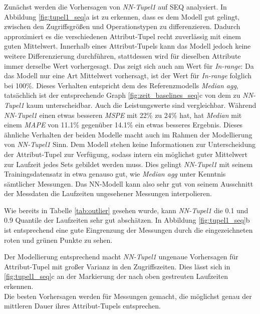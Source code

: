 \documentclass[
	12pt,
	a4paper,
	BCOR10mm,
	DIV14,
	listof=totoc,
	bibliography=totoc,
	headsepline
]{scrreprt}
\begin{document}
Zunächst werden die Vorhersagen von \textit{NN-Tupel1} auf SEQ analysiert.
In Abbildung \ref{fig:tupel1_seq}a ist zu erkennen, dass es dem Modell gut gelingt, zwischen den Zugriffsgrößen und Operationstypen zu differenzieren. Dadurch approximiert es die verschiedenen Attribut-Tupel recht zuverlässig mit einem guten Mittelwert.
Innerhalb eines Attribut-Tupels kann das Modell jedoch keine weitere Differenzierung durchführen, stattdessen wird für dieselben Attribute immer derselbe Wert vorhergesagt.
Das zeigt sich auch am Wert für \textit{In-range}: Da das Modell nur eine Art Mittelwert vorhersagt, ist der Wert für \textit{In-range} folglich bei 100\%.
Dieses Verhalten entspricht dem des Referenzmodells \textit{Median agg}, tatsächlich ist der entsprechende Graph \ref{fig:zeit_baselines_seq}c von dem zu \textit{NN-Tupel1} kaum unterscheidbar.
Auch die Leistungswerte sind vergleichbar. Während \textit{NN-Tupel1} einen etwas besseren \textit{MSPE} mit 22\% zu 24\% hat, hat \textit{Median} mit einem \textit{MAPE} von 11.1\% gegenüber 14.1\% ein etwas besseres Ergebnis. 
Dieses ähnliche Verhalten  der beiden Modelle macht auch im Rahmen der Modellierung von \textit{NN-Tupel1} Sinn.
Dem Modell stehen keine Informationen zur Unterscheidung der Attribut-Tupel zur Verfügung, sodass intern ein möglichst guter Mittelwert zur Laufzeit jedes Sets gebildet werden muss. Dies gelingt \textit{NN-Tupel1} mit seinem Trainingsdatensatz in etwa genauso gut, wie \textit{Median agg} unter Kenntnis sämtlicher Messungen. Das NN-Modell kann also sehr gut von seinem Ausschnitt der Messdaten die Laufzeiten ungesehener Messungen interpolieren.\medskip

Wie bereits in Tabelle \ref{tab:outlier} gesehen wurde, kann \textit{NN-Tupel1} die 0.1 und 0.9 Quantile der Laufzeiten sehr gut abschätzen.
In Abbildung \ref{fig:tupel1_seq}b ist entsprechend eine gute Eingrenzung der Messungen durch die eingezeichneten roten und grünen Punkte zu sehen.\medskip

Der Modellierung entsprechend macht \textit{NN-Tupel1} ungenaue Vorhersagen für Attribut-Tupel mit großer Varianz in den Zugriffszeiten. 
Dies lässt sich in \ref{fig:tupel1_seq}c an der Markierung der nach oben gestreuten Laufzeiten erkennen.\\
Die besten Vorhersagen werden für Messungen gemacht, die möglichst genau der mittleren Dauer ihres Attribut-Tupels entsprechen.\medskip
\end{document}
